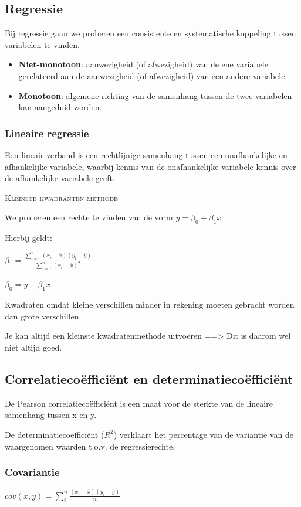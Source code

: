 \documentclass[a4paper,12pt]{article}
\begin{document}
\subsection{Regressie}
Bij regressie gaan we proberen een consistente en systematische koppeling tussen variabelen te vinden.

\begin{itemize}
\item	\textbf{Niet-monotoon}: aanwezigheid (of afwezigheid) van de ene variabele gerelateerd aan de aanwezigheid (of afwezigheid) van een andere variabele.
\item	\textbf{Monotoon}: algemene richting van de samenhang tussen de twee variabelen kan aangeduid worden.
\end{itemize}

\subsubsection{Lineaire regressie}
Een lineair verband is een rechtlijnige samenhang tussen een onafhankelijke en afhankelijke variabele, waarbij kennis van de onafhankelijke variabele kennis over de afhankelijke variabele geeft.

\textsc{Kleinste kwadranten methode}

We proberen een rechte te vinden van de vorm $y=\beta_0+\beta_1x$

Hierbij geldt:

$\beta_1 = 
\frac
{\sum^n_{i=1}(x_i-\overline{x})(y_i-\overline{y})}
{\sum^n_{i=1}(x_i - \overline{x})^2}$

$\beta_0 = \overline{y} - \beta_1 \overline{x}$

Kwadraten omdat kleine verschillen minder in rekening moeten gebracht worden dan grote verschillen.
	
Je kan altijd een kleinste kwadratenmethode uitvoeren ==> Dit is daarom wel niet altijd goed.

\subsection{Correlatiecoëfficiënt en determinatiecoëfficiënt}
De Pearson correlatiecoëfficiënt is een maat voor de sterkte van de lineaire samenhang tussen x en y.

De determinatiecoëfficiënt ($R^2$) verklaart het percentage van de variantie van de waargenomen waarden t.o.v. de regressierechte.

\subsubsection{Covariantie}
$cov(x,y) = \sum^n_i 
\frac
{(x_i-\overline{x})(y_i-\overline{y})}
{n}$
\end{document}
